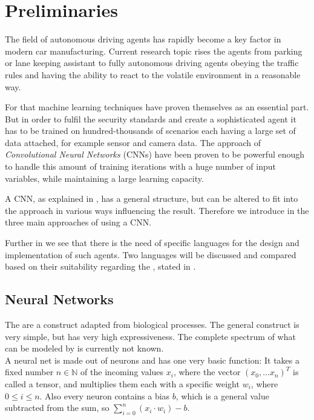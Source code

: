 \chapter{Preliminaries}

The field of autonomous driving agents has rapidly become a key factor in modern car manufacturing. Current research topic rises the agents from parking or lane keeping assistant to fully autonomous driving agents obeying the traffic rules and having the ability to react to the volatile environment in a reasonable way.

For that machine learning techniques have proven themselves as an essential part. But in order to fulfil the security standards and create a sophisticated agent it has to be trained on hundred-thousands of scenarios each having a large set of data attached, for example sensor and camera data.
The approach of \textit{Convolutional Neural Networks} (CNNs) have been proven to be powerful enough to handle this amount of training iterations with a huge number of input variables, while maintaining a large learning capacity. \cite{krizhevsky2012imagenet}

A CNN, as explained in , has a general structure, but can be altered to fit into the approach in various ways influencing the result. Therefore we introduce in  the three main approaches of using a CNN.

Further in  we see that there is the need of specific languages for the design and implementation of such agents. Two languages will be discussed and compared based on their suitability regarding the \alexnet, stated in  .

\section{Neural Networks}\label{sec: NN}

The \nns are a construct adapted from biological processes. The general construct is very simple, but has  very high expressiveness. The complete spectrum of what can be modeled by \nns is currently not known.\\
A neural net is made out of neurons and has one very basic function:
It takes a fixed number $n \in \mathbb{N}$ of the incoming values $x_i$, where the vector $(x_0,\dots x_n)^T$ is called a tensor, and multiplies them each with a specific weight $w_i$, where $0 \le i \le n$.
Also every neuron contains a bias $b$, which is a general value subtracted from the sum, so $\sum_{i=0}^{n} (x_i \cdot w_i) -b$. 

